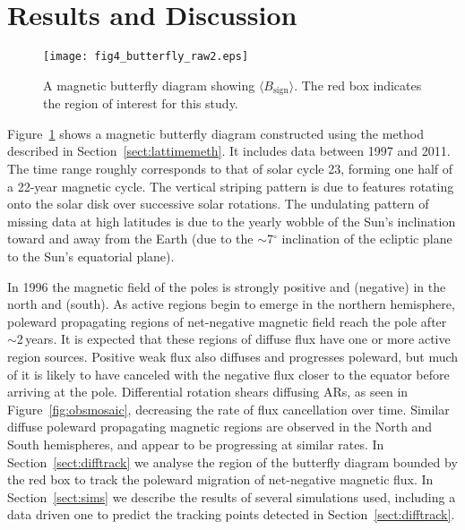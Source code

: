 \section{Results and Discussion}\label{sect:resdisc}

 \begin{figure}[!t]    %
   \centerline{\texttt{[image: fig4\_butterfly\_raw2.eps]}
              }
              \caption[A magnetic butterfly diagram showing $\langle B_{\mathrm{sign}} \rangle$.]{A magnetic butterfly diagram showing $\langle B_{\mathrm{sign}} \rangle$. The red box indicates the region of interest for this study.}
   \label{fig:butterfly_raw}
   \end{figure}


Figure~\ref{fig:butterfly_raw} shows a magnetic butterfly diagram constructed using the method described in Section~\ref{sect:lattimemeth}. It includes data between 1997 and 2011. The time range roughly corresponds to that of solar cycle 23, forming one half of a 22-year magnetic cycle. 
The vertical striping pattern is due to features rotating onto the solar disk over successive solar rotations. The undulating pattern of missing data at high latitudes is due to the yearly wobble of the Sun's inclination toward and away from the Earth (due to the $\sim$7$^{\circ}$ inclination of the ecliptic plane to the Sun's equatorial plane).

In 1996 the magnetic field of the poles is strongly positive and (negative) in the north and (south). As active regions begin to emerge in the northern hemisphere, poleward propagating regions of net-negative magnetic field reach the pole after $\sim$2\,years. It is expected that these regions of diffuse flux have one or more active region sources. Positive weak flux also diffuses and progresses poleward, but much of it is likely to have canceled with the negative flux closer to the equator before arriving at the pole. 
Differential rotation shears diffusing ARs, as seen in Figure~\ref{fig:obsmosaic}, decreasing the rate of flux cancellation over time. Similar diffuse poleward propagating magnetic regions are observed in the North and South hemispheres, and appear to be progressing at similar rates. In Section~\ref{sect:difftrack} we analyse the region of the butterfly diagram bounded by the red box to track the poleward migration of net-negative magnetic flux. In Section~\ref{sect:sims} we describe the results of several simulations used, including a data driven one to predict the tracking points detected in Section~\ref{sect:difftrack}.



